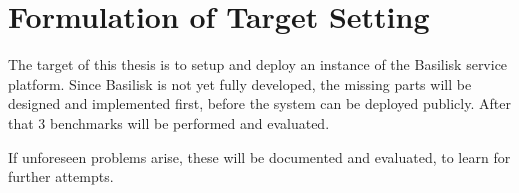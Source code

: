 \chapter{Formulation of Target Setting}
\label{ch:target_setting}

The target of this thesis is to setup and deploy an instance of the Basilisk service platform.
Since Basilisk is not yet fully developed, the missing parts will be designed and implemented first, before the system can be deployed publicly.
After that 3 benchmarks will be performed and evaluated.

If unforeseen problems arise, these will be documented and evaluated, to learn for further attempts.






%
%
%
